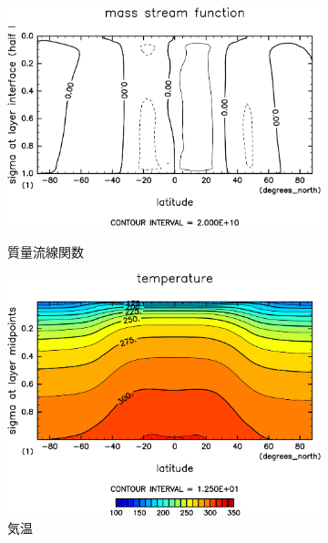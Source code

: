 \documentclass[body]{subfiles}
\begin{document}
\begin{figure}[t]
\begin{subfigure}{.4\textwidth}
		\includegraphics[width=\textwidth]{S1800/MSF,time=3650:4015-crop-rotate.pdf}
		\\\vspace{13pt}
		\caption{質量流線関数\hmu*{[kg/s]}}\label{S1800質量流線関数}
	\end{subfigure}
	\begin{subfigure}{.4\textwidth}
		\centering
		\includegraphics[width=\textwidth]{S1800/Temp,time=3650:4015-crop-rotate.pdf}
		\caption{気温\hmu*{[K]}}\label{S1800気温分布}
	\end{subfigure}
	\begin{subfigure}{.4\textwidth}
		\centering

\end{subfigure}
\end{figure}
\end{document}
